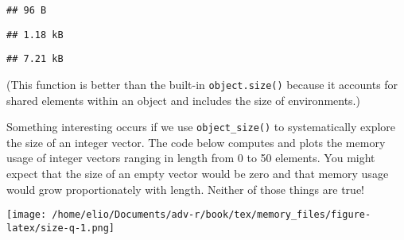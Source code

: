 \begin{verbatim}
## 96 B
\end{verbatim}

\begin{Shaded}
\begin{Highlighting}[]
\end{Highlighting}
\end{Shaded}

\begin{verbatim}
## 1.18 kB
\end{verbatim}

\begin{Shaded}
\begin{Highlighting}[]
\end{Highlighting}
\end{Shaded}

\begin{verbatim}
## 7.21 kB
\end{verbatim}

(This function is better than the built-in \texttt{object.size()}
because it accounts for shared elements within an object and includes
the size of environments.)

Something interesting occurs if we use \texttt{object\_size()} to
systematically explore the size of an integer vector. The code below
computes and plots the memory usage of integer vectors ranging in length
from 0 to 50 elements. You might expect that the size of an empty vector
would be zero and that memory usage would grow proportionately with
length. Neither of those things are true! 

\begin{Shaded}
\begin{Highlighting}[]
\StringTok{ }\NormalTok{(}\OperatorTok{:}\NormalTok{, }\NormalTok{(}
\NormalTok{(}\OperatorTok{:} \NormalTok{, } \NormalTok{, }
   \NormalTok{)}
\end{Highlighting}
\end{Shaded}

\texttt{[image: /home/elio/Documents/adv-r/book/tex/memory\_files/figure-latex/size-q-1.png]}


